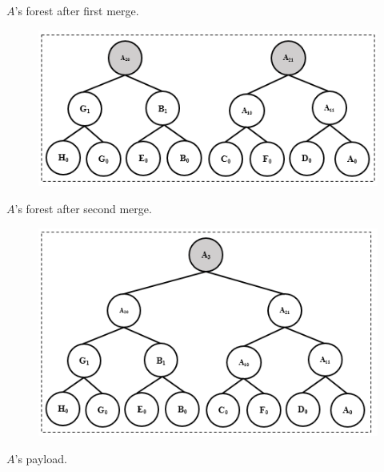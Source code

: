 \documentclass[%
  slidesonly,%
  semlayer%
  ]{seminar}                                  %
\begin{document}
\begin{slide}
      \begin{tiny}
      \begin{center}
        $A$'s forest after first merge.
      \end{center}
      \end{tiny}
      \begin{figure}
        \centering
        \includegraphics[scale = 0.4]{images/a-forest-second-merge-shia.png}
      \end{figure}
      \begin{tiny}
      \begin{center}
          $A$'s forest after second merge.
      \end{center}
      \end{tiny}
      \begin{figure}
        \centering
        \includegraphics[scale = 0.4]{images/a-payload-shia.png}
      \end{figure}
      \begin{tiny}
        \begin{center}
            $A$'s payload.
        \end{center}
      \end{tiny}


\end{slide}
\end{document}
